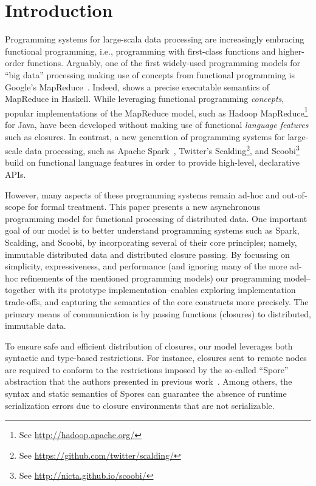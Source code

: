 \documentclass{easychair}
\begin{document}
\section{Introduction}
\label{sec:introduction}

Programming systems for large-scala data processing are increasingly embracing
functional programming, i.e., programming with first-class functions and
higher-order functions. Arguably, one of the first widely-used programming
models for ``big data'' processing making use of concepts from functional
programming is Google's MapReduce~\cite{DeanG08}. Indeed, \cite{Lammel08}
shows a precise executable semantics of MapReduce in Haskell. While leveraging
functional programming \emph{concepts}, popular implementations of the
MapReduce model, such as Hadoop MapReduce\footnote{See \url{http://hadoop.apache.org/}}
for Java, have been developed without making
use of functional \emph{language features} such as closures. In contrast, a new generation
of programming systems for large-scale data processing, such as
Apache Spark~\cite{Zaharia2012},
Twitter's Scalding\footnote{See \url{https://github.com/twitter/scalding/}},
and Scoobi\footnote{See \url{http://nicta.github.io/scoobi/}} build on functional
language features in order to provide high-level, declarative APIs.

However, many aspects of these programming systems remain ad-hoc and
out-of-scope for formal treatment. This paper presents a new asynchronous programming
model for functional processing of distributed data. One important goal of our
model is to better understand programming systems such as Spark, Scalding, and
Scoobi, by incorporating several of their core principles; namely, immutable
distributed data and distributed closure passing. By focussing on simplicity,
expressiveness, and performance (and ignoring many of the more ad-hoc
refinements of the mentioned programming models) our
programming model--together with its prototype implementation--enables exploring
implementation trade-offs, and capturing the semantics of the core constructs more
precisely. The primary means of communication is by passing functions (closures)
to distributed, immutable data.

To ensure safe and efficient distribution of closures, our model leverages
both syntactic and type-based restrictions. For instance, closures sent to
remote nodes are required to conform to the restrictions imposed by the
so-called ``Spore'' abstraction that the authors presented in previous
work~\cite{MillerHO14}. Among others, the syntax and static semantics of
Spores can guarantee the absence of runtime serialization errors due to
closure environments that are not serializable.
\end{document}

